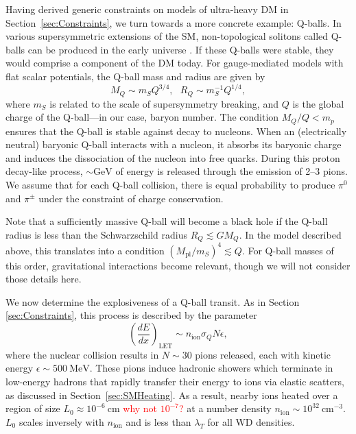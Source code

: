 \documentclass[preprintnumbers,amsmath,amssymb,prd, superscriptaddress,twocolumn]{revtex4}
\def\r{\right)}
\def\l{\left(}
\begin{document}
Having derived generic constraints on models of ultra-heavy DM in Section~\ref{sec:Constraints}, we turn towards a more concrete example: Q-balls.
In various supersymmetric extensions of the SM, non-topological solitons called Q-balls can be produced in the early universe \cite{Coleman:1985ki, Kusenko:1997si}.
If these Q-balls were stable, they would comprise a component of the DM today.
For gauge-mediated models with flat scalar potentials, the Q-ball mass and radius are given by
\begin{equation}
\label{eq:Qballprop}
M_Q \sim m_S Q^{3/4}, ~~~ R_Q \sim m_S^{-1} Q^{1/4},
\end{equation}
where $m_S$ is related to the scale of supersymmetry breaking, and $Q$ is the global charge of the Q-ball---in our case, baryon number.
The condition $M_Q/Q < m_p$ ensures that the Q-ball is stable against decay to nucleons.
When an (electrically neutral) baryonic Q-ball interacts with a nucleon, it absorbs its baryonic charge and induces the dissociation of the nucleon into free quarks.
During this proton decay-like process, $\sim \text{GeV}$ of energy is released through the emission of 2--3 pions.
We assume that for each Q-ball collision, there is equal probability to produce $\pi^0$ and $\pi^\pm$ under the constraint of charge conservation.

Note that a sufficiently massive Q-ball will become a black hole if the Q-ball radius is less than the Schwarzschild radius $R_Q \lesssim G M_Q$.
In the model described above, this translates into a condition $(M_\text{pl}/m_S)^4 \lesssim Q$.
For Q-ball masses of this order, gravitational interactions become relevant, though we will not consider those details here.

We now determine the explosiveness of a Q-ball transit.
As in Section \ref{sec:Constraints}, this process is described by the parameter
\begin{equation}
\label{eq:QballLET}
\l\frac{dE}{dx}\r_\text{LET} \sim n_\text{ion} \sigma_Q N \epsilon,
\end{equation}
where the nuclear collision results in $N \sim 30$ pions released, each with kinetic energy $\epsilon \sim 500 ~\text{MeV}$.
These pions induce hadronic showers which terminate in low-energy hadrons that rapidly transfer their energy to ions via elastic scatters, as discussed in Section~\ref{sec:SMHeating}.
As a result, nearby ions heated over a region of size $L_0 \approx 10^{-6} ~\text{cm}$ \textcolor{red}{why not $10^{-7}$?} at a number density $n_\text{ion} \sim 10^{32}~\text{cm}^{-3}$.
$L_0$ scales inversely with $n_\text{ion}$ and is less than $\lambda_T$ for all WD densities.
\end{document}
